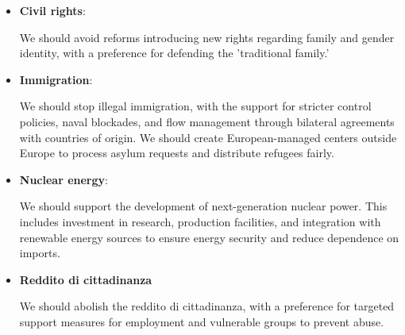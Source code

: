 \label{M5S_opinions}

\begin{itemize}
    \item \textbf{Civil rights}:
        \begin{tcolorbox} We should avoid reforms introducing new rights regarding family and gender identity, with a preference for defending the 'traditional family.'
        \end{tcolorbox}

    \item \textbf{Immigration}:
        \begin{tcolorbox} We should stop illegal immigration, with the support for stricter control policies, naval blockades, and flow management through bilateral agreements with countries of origin. We should create European-managed centers outside Europe to process asylum requests and distribute refugees fairly.
        \end{tcolorbox}
        
    \item \textbf{Nuclear energy}: 
        \begin{tcolorbox} We should support the development of next-generation nuclear power. This includes investment in research, production facilities, and integration with renewable energy sources to ensure energy security and reduce dependence on imports.
        \end{tcolorbox}
    
    \item \textbf{Reddito di cittadinanza}
        \begin{tcolorbox} We should abolish the reddito di cittadinanza, with a preference for targeted support measures for employment and vulnerable groups to prevent abuse.
        \end{tcolorbox}
\end{itemize}